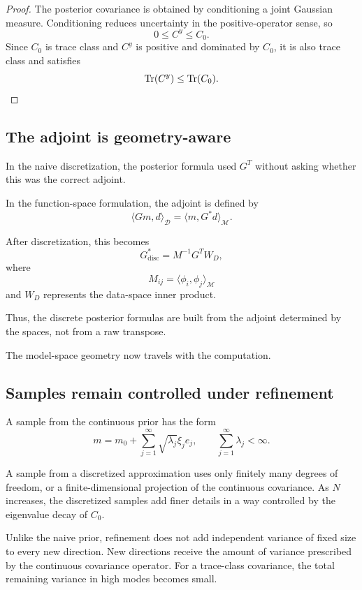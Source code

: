 \documentclass[11pt,a4paper]{book}
\newcommand{\M}{\mathcal{M}}      %
\newcommand{\D}{\mathcal{D}}      %
\newcommand{\G}{G}
\newcommand{\Gadj}{G^\ast}
\begin{document}
\begin{proof}
The posterior covariance is obtained by conditioning a joint Gaussian measure.
Conditioning reduces uncertainty in the positive-operator sense, so
\[
    0\leq C^y\leq C_0.
\]
Since $C_0$ is trace class and $C^y$ is positive and dominated by $C_0$, it is
also trace class and satisfies
\[
    \Tr(C^y)\leq \Tr(C_0).
\]
\end{proof}

\subsection{The adjoint is geometry-aware}

In the naive discretization, the posterior formula used $G^T$ without asking
whether this was the correct adjoint.

In the function-space formulation, the adjoint is defined by
\[
    \langle \G m,d\rangle_{\D}
    =
    \langle m,\Gadj d\rangle_{\M}.
\]

After discretization, this becomes
\[
    G^\ast_{\mathrm{disc}}
    =
    M^{-1}G^T W_D,
\]
where
\[
    M_{ij}
    =
    \langle \phi_i,\phi_j\rangle_{\M}
\]
and $W_D$ represents the data-space inner product.

Thus, the discrete posterior formulas are built from the adjoint determined by
the spaces, not from a raw transpose.

The model-space geometry now travels with the computation.

\subsection{Samples remain controlled under refinement}

A sample from the continuous prior has the form
\[
    m
    =
    m_0
    +
    \sum_{j=1}^{\infty}
    \sqrt{\lambda_j}\xi_j e_j,
    \qquad
    \sum_{j=1}^{\infty}\lambda_j<\infty.
\]

A sample from a discretized approximation uses only finitely many degrees of
freedom, or a finite-dimensional projection of the continuous covariance. As
$N$ increases, the discretized samples add finer details in a way controlled by
the eigenvalue decay of $C_0$.

Unlike the naive prior, refinement does not add independent variance of fixed
size to every new direction. New directions receive the amount of variance
prescribed by the continuous covariance operator. For a trace-class covariance,
the total remaining variance in high modes becomes small.
\end{document}
